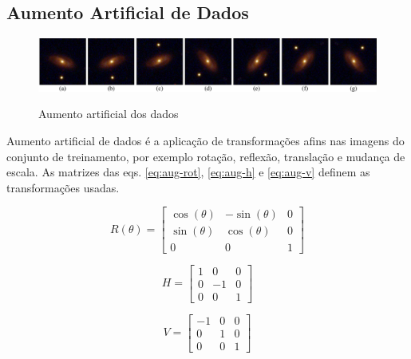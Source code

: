 \subsection{Aumento Artificial de Dados}
\label{sec:modelo-dataaug}

\begin{figure}[!ht]
  \centering
  \caption{Aumento artificial dos dados}
  \includegraphics[width=\linewidth]{figures/dataaug.pdf}
  \label{fig:dataaug}
\end{figure}

Aumento artificial de dados \cite{Larry1996} é a aplicação de transformações afins nas imagens do conjunto de treinamento, por exemplo rotação, reflexão, translação e mudança de escala. As matrizes das eqs. \eqref{eq:aug-rot}, \eqref{eq:aug-h} e \eqref{eq:aug-v} definem as transformações usadas.


\begin{equation}\label{eq:aug-rot}
  R(\theta) =
  \begin{bmatrix}
    \cos(\theta) & -\sin(\theta) & 0 \\
    \sin(\theta) & \cos(\theta)  & 0 \\
    0            & 0             & 1
  \end{bmatrix}
\end{equation}


\begin{equation}\label{eq:aug-h}
  H =
  \begin{bmatrix}
    1 & 0  & 0 \\
    0 & -1 & 0 \\
    0 & 0  & 1
  \end{bmatrix}
\end{equation}


\begin{equation}\label{eq:aug-v}
  V =
  \begin{bmatrix}
    -1 & 0 & 0 \\
    0  & 1 & 0 \\
    0  & 0 & 1
  \end{bmatrix}
\end{equation}


